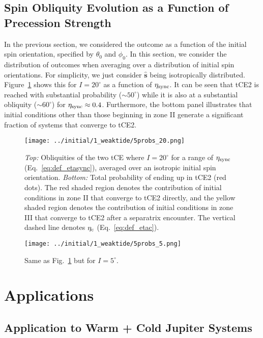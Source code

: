 \documentclass[
        fleqn,
        usenatbib,
    ]{mnras}
\newcommand*{\uv}[1]{\hat{\mathbf{#1}}}
\begin{document}
\subsection{Spin Obliquity Evolution as a Function of Precession Strength}

In the previous section, we considered the outcome as a function of the initial
spin orientation, specified by $\theta_0$ and $\phi_0$. In this section, we
consider the distribution of outcomes when averaging over a distribution of
initial spin orientations. For simplicity, we just consider $\uv{s}$ being
isotropically distributed. Figure~\ref{fig:probs20} shows this for $I
= 20^\circ$ as a function of $\eta_{\rm sync}$. It can be seen that tCE2 is
reached with substantial probability ($\sim 50^\circ$) while it is also at a
substantial obliquity ($\sim 60^\circ$) for $\eta_{\rm sync} \approx 0.4$.
Furthermore, the bottom panel illustrates that initial conditions other than
those beginning in zone II generate a significant fraction of systems that
converge to tCE2.
\begin{figure}
    \centering
    \texttt{[image: ../initial/1\_weaktide/5probs\_20.png]}
    \caption{\emph{Top:} Obliquities of the two tCE where $I = 20^\circ$ for a
    range of $\eta_{\rm sync}$ (Eq.~\ref{eq:def_etasync}), averaged over an
    isotropic initial spin orientation. \emph{Bottom:} Total probability of
    ending up in tCE2 (red dots). The red shaded region denotes the contribution
    of initial conditions in zone II that converge to tCE2 directly, and the
    yellow shaded region denotes the contribution of initial conditions in zone
    III that converge to tCE2 after a separatrix encounter. The vertical dashed
    line denotes $\eta_{\rm c}$ (Eq.~\ref{eq:def_etac}).}\label{fig:probs20}
\end{figure}
\begin{figure}
    \centering
    \texttt{[image: ../initial/1\_weaktide/5probs\_5.png]}
    \caption{Same as Fig.~\ref{fig:probs20} but for $I =
    5^\circ$.}\label{fig:probs5}
\end{figure}

\section{Applications}

\subsection{Application to Warm + Cold Jupiter Systems
}\label{ss:disc_sehj}
\end{document}
